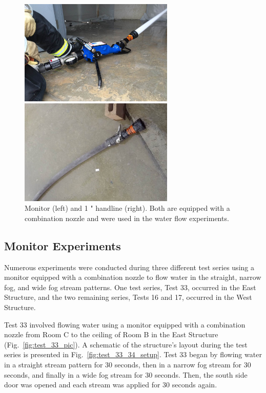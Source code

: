 \documentclass[12pt,oneside]{book}
\begin{document}
\begin{figure}[!ht]
\minipage{3in}
\begin{center}
	\includegraphics[width=2.9in]{../Pictures/monitor}
\end{center} 
\endminipage \hfill
\minipage{3in}
\begin{center}
	\includegraphics[width=2.9in]{../Pictures/handline}
\end{center}
\endminipage \hfill
\caption[Monitor and Handline Equipped with Combination Nozzle]{Monitor (left) and 1 " handline (right). Both are equipped with a combination nozzle and were used in the water flow experiments.}
\label{fig:monitor+handline}
\end{figure}
\FloatBarrier

\subsection{Monitor Experiments}
\label{sec:Water_Flow_Monitor_Procedure}
Numerous experiments were conducted during three different test series using a monitor equipped with a combination nozzle to flow water in the straight, narrow fog, and wide fog stream patterns. One test series, Test 33, occurred in the East Structure, and the two remaining series, Tests 16 and 17, occurred in the West Structure. 

Test 33 involved flowing water using a monitor equipped with a combination nozzle from Room C to the ceiling of Room B in the East Structure (Fig.~\ref{fig:test_33_pic}). A schematic of the structure's layout during the test series is presented in Fig.~\ref{fig:test_33_34_setup}. Test 33 began by flowing water in a straight stream pattern for 30 seconds, then in a narrow fog stream for 30 seconds, and finally in a wide fog stream for 30 seconds. Then, the south side door was opened and each stream was applied for 30 seconds again.
\end{document}
